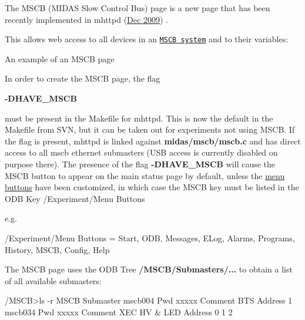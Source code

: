 The MSCB (MIDAS Slow Control Bus) page is a new page that has been recently implemented in mhttpd (\hyperlink{NDF_ndf_dec_2009}{Dec 2009}) .

\par
 This allows web access to all devices in an \href{http://midas.psi.ch/mscb}{\tt MSCB system} and to their variables:

\par
\par
\par
 \begin{center}  An example of an MSCB page \par
\par
\par
  \end{center}  \par
\par
\par
 \par


In order to create the MSCB page, the flag \par
 {\bfseries -\/DHAVE\_\-MSCB} \par
 must be present in the Makefile for mhttpd. This is now the default in the Makefile from SVN, but it can be taken out for experiments not using MSCB. If the flag is present, mhttpd is linked against {\bfseries midas/mscb/mscb.c} and has direct access to all mscb ethernet submasters (USB access is currently disabled on purpose there). The presence of the flag {\bfseries -\/DHAVE\_\-MSCB} will cause the MSCB button to appear on the main status page by default, unless the \hyperlink{RC_mhttpd_status_page_features_RC_mhttpd_status_menu_buttons}{menu buttons} have been customized, in which case the MSCB key must be listed in the ODB Key /Experiment/Menu Buttons\par
e.g. 
\begin{DoxyCode}
/Experiment/Menu Buttons = Start, ODB, Messages, ELog, Alarms, Programs, History,
       MSCB, Config, Help
\end{DoxyCode}


The MSCB page uses the ODB Tree {\bfseries /MSCB/Submasters/...} to obtain a list of all available submasters:\par



\begin{DoxyCode}
/MSCB>ls -r
MSCB
    Submaster
        mscb004
            Pwd                 xxxxx
            Comment             BTS
            Address             1
        mscb034
            Pwd                 xxxxx
            Comment             XEC HV & LED
            Address
                                0
                                1
                                2
\end{DoxyCode}


